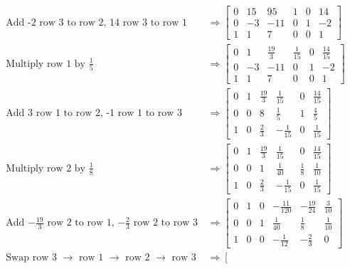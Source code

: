 \documentclass[11pt]{homework}
\begin{document}
\begin{align*}
\text{Add -2 row 3 to row 2, 14 row 3 to row 1}
  &\Rightarrow
  \left[
  \begin{array}{ccc|ccc}
  0 & 15  & 95  & 1 & 0 & 14 \\
  0  & -3 & -11 & 0 & 1 & -2 \\
  1 & 1   & 7   & 0 & 0 & 1
  \end{array}
  \right] \\
\text{Multiply row 1 by $\frac{1}{5}$}
  &\Rightarrow
  \left[
  \begin{array}{ccc|ccc}
  0 & 1  & \frac{19}{3}  & \frac{1}{15} & 0 & \frac{14}{15} \\
  0  & -3 & -11 & 0 & 1 & -2 \\
  1 & 1   & 7   & 0 & 0 & 1
  \end{array}
  \right] \\
\text{Add 3 row 1 to row 2, -1 row 1 to row 3}
  &\Rightarrow
  \left[
  \begin{array}{ccc|ccc}
  0 & 1 & \frac{19}{3}  & \frac{1}{15}  & 0 & \frac{14}{15} \\
  0 & 0 & 8             & \frac{1}{5}   & 1 & \frac{4}{5} \\
  1 & 0 & \frac{2}{3}   & -\frac{1}{15} & 0 & \frac{1}{15} 
  \end{array}
  \right] \\
\text{Multiply row 2 by $\frac{1}{8}$}
  &\Rightarrow
  \left[
  \begin{array}{ccc|ccc}
  0 & 1 & \frac{19}{3}  & \frac{1}{15}  & 0           & \frac{14}{15} \\
  0 & 0 & 1             & \frac{1}{40}  & \frac{1}{8} & \frac{1}{10} \\
  1 & 0 & \frac{2}{3}   & -\frac{1}{15} & 0           & \frac{1}{15} 
  \end{array}
  \right] \\
\text{Add $-\frac{19}{3}$ row 2 to row 1, $-\frac{2}{3}$ row 2 to row 3}
  &\Rightarrow
  \left[
  \begin{array}{ccc|ccc}
  0 & 1 & 0 & -\frac{11}{120} & -\frac{19}{24} & \frac{3}{10} \\
  0 & 0 & 1 &  \frac{1}{40}   & \frac{1}{8}    & \frac{1}{10} \\
  1 & 0 & 0 & -\frac{1}{12}   & -\frac{2}{3}   & 0
  \end{array}
  \right] \\
\text{Swap row 3 $\rightarrow$ row 1 $\rightarrow$ row 2 $\rightarrow$ row 3 }
  &\Rightarrow
  \left[
  \begin{array}{ccc|ccc}

\end{array}
\end{align*}
\end{document}
